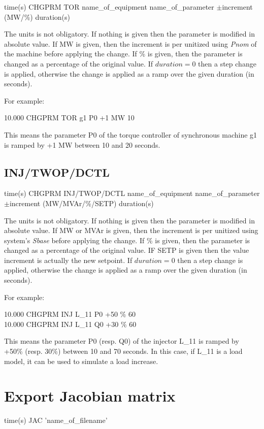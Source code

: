 time(s) CHGPRM TOR name\_of\_equipment name\_of\_parameter
	$\pm$increment (MW/\%) duration(s) 
	
The units is
not obligatory. If nothing is given then the parameter is modified
in absolute value. If MW is given, then the increment is per unitized
using \emph{Pnom} of the machine before applying the change. If \%
is given, then the parameter is changed as a percentage of the original
value. If $duration=0$ then a step change is applied, otherwise the
change is applied as a ramp over the given duration (in seconds). 

For example:

10.000 CHGPRM TOR g1 P0 +1 MW 10 

This
means the parameter P0 of the torque controller of synchronous machine
g1 is ramped by +1 MW between 10 and 20 seconds.


\subsection{INJ/TWOP/DCTL}

time(s) CHGPRM INJ/TWOP/DCTL name\_of\_equipment
	name\_of\_parameter $\pm$increment (MW/MVAr/\%/SETP) duration(s)

The units is not obligatory. If nothing is given
then the parameter is modified in absolute value. If MW or MVAr is
given, then the increment is per unitized using system's \emph{Sbase}
before applying the change. If \% is given, then the parameter is
changed as a percentage of the original value. IF SETP is given then
the value increment is actually the new setpoint. If $duration=0$
then a step change is applied, otherwise the change is applied as
a ramp over the given duration (in seconds). 

For example:

10.000 CHGPRM INJ L\_11 P0 +50 \% 60 \\
10.000 CHGPRM INJ L\_11 Q0 +30 \% 60 
	
	This means the
parameter P0 (resp. Q0) of the injector L\_11 is ramped by +50\% (resp.
30\%) between 10 and 70 seconds. In this case, if L\_11 is a load
model, it can be used to simulate a load increase.


\section{Export Jacobian matrix}

time(s) JAC 'name\_of\_filename' 

